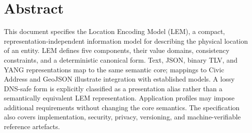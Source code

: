 \documentclass[polish,a4paper,oneside]{ppfcmthesis}
\renewcommand{\thefigure}{\thechapter.\arabic{figure}.}
\renewcommand{\thetable}{\thechapter.\arabic{table}.}
\begin{document}
\thispagestyle{empty}
\section*{Abstract}
This document specifies the Location Encoding Model (LEM), a compact, representation-independent information model for describing the physical location of an entity. LEM defines five components, their value domains, consistency constraints, and a deterministic canonical form. Text, JSON, binary TLV, and YANG representations map to the same semantic core; mappings to Civic Address and GeoJSON illustrate integration with established models. A lossy DNS-safe form is explicitly classified as a presentation alias rather than a semantically equivalent LEM representation. Application profiles may impose additional requirements without changing the core semantics. The specification also covers implementation, security, privacy, versioning, and machine-verifiable reference artefacts.
\vfill\cleardoublepage



\pagestyle{ppfcmthesis}
\tableofcontents*
\cleardoublepage


% 
% 
% 
% 



\mainmatter
\renewcommand{\thefigure}{\thechapter.\arabic{figure}.}
\renewcommand{\thetable}{\thechapter.\arabic{table}.}
\end{document}
